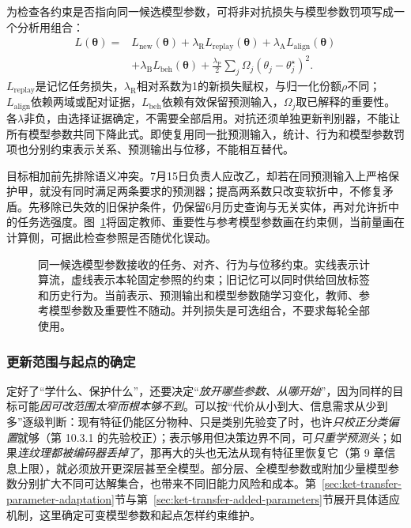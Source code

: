 为检查各约束是否指向同一候选模型参数，可将非对抗损失与模型参数罚项写成一个分析用组合：
\begin{equation}
\begin{split}
L(\bm\theta)={}&L_{\mathrm{new}}(\bm\theta)
+\lambda_{\mathrm R}L_{\mathrm{replay}}(\bm\theta)
+\lambda_{\mathrm A}L_{\mathrm{align}}(\bm\theta)\\
&+\lambda_{\mathrm B}L_{\mathrm{beh}}(\bm\theta)
+\frac{\lambda_{\mathrm P}}2
\sum_j\Omega_j(\theta_j-\theta_j^\star)^2.
\end{split}
\label{eq:ket-update-joint-objective}
\end{equation}
$L_{\mathrm{replay}}$是记忆任务损失，$\lambda_{\mathrm R}$相对系数为1的新损失赋权，与归一化份额$\rho$不同；$L_{\mathrm{align}}$依赖两域或配对证据，$L_{\mathrm{beh}}$依赖有效保留预测输入，$\Omega_j$取已解释的重要性。各$\lambda$非负，由选择证据确定，不需要全部启用。对抗还须单独更新判别器，不能让所有模型参数共同下降此式。即使复用同一批预测输入，统计、行为和模型参数罚项也分别约束表示关系、预测输出与位移，不能相互替代。

目标相加前先排除语义冲突。7月15日负责人应改乙，却若在同预测输入上严格保护甲，就没有同时满足两条要求的预测器；提高两系数只改变软折中，不修复矛盾。先移除已失效的旧保护条件，仍保留6月历史查询与无关实体，再对允许折中的任务选强度。图~\ref{fig:ket-update-objective}将固定教师、重要性与参考模型参数画在约束侧，当前量画在计算侧，可据此检查参照是否随优化误动。

\begin{figure}[htbp]
\centering

\caption{同一候选模型参数接收的任务、对齐、行为与位移约束。实线表示计算流，虚线表示本轮固定参照的约束；旧记忆可以同时供给回放标签和历史行为。当前表示、预测输出和模型参数随学习变化，教师、参考模型参数及重要性不随动。并列损失是可选组合，不要求每轮全部使用。}
\label{fig:ket-update-objective}
\end{figure}

\FloatBarrier
\subsubsection{更新范围与起点的确定}
\label{sec:ket-update-range}

定好了“学什么、保护什么”，还要决定“\emph{放开\emph{哪些}参数、\emph{从哪}开始}”，因为同样的目标可能\emph{因可改范围太窄而根本够不到}。可以按“代价从小到大、信息需求从少到多”逐级判断：现有特征仍能区分物种、只是类别先验变了时，也许\emph{只校正分类偏置}就够（第 10.3.1 的先验校正）；表示够用但决策边界不同，可\emph{只重学预测头}；如果\emph{连纹理都被编码器丢掉了}，那再大的头也无法从现有特征里恢复它（第 9 章信息上限），就必须放开更深层甚至全模型。部分层、全模型参数或附加少量模型参数分别扩大不同可达解集合，也带来不同旧能力风险和成本。第~\ref{sec:ket-transfer-parameter-adaptation}节与第~\ref{sec:ket-transfer-added-parameters}节展开具体适应机制，这里确定可变模型参数和起点怎样约束维护。

